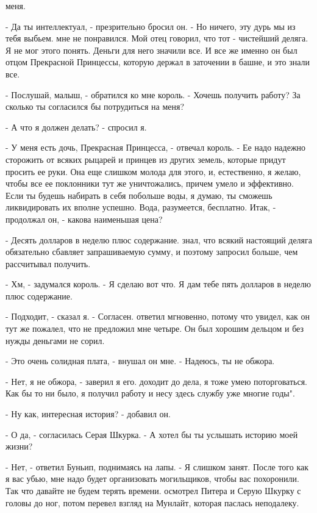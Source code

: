меня.
\par- Да ты интеллектуал, - презрительно бросил он. - Но ничего, эту 
дурь мы из тебя выбьем.
 мне не понравился. Мой отец говорил, что тот - чистейший 
деляга. Я не мог этого понять. Деньги для него значили все. И все же 
именно он был отцом Прекрасной Принцессы, которую держал в заточении в 
башне, и это знали все.
\par- Послушай, малыш, - обратился ко мне король. - Хочешь получить 
работу? За сколько ты согласился бы потрудиться на меня?
\par- А что я должен делать? - спросил я.
\par- У меня есть дочь, Прекрасная Принцесса, - отвечал король. - Ее 
надо надежно сторожить от всяких рыцарей и принцев из других земель, 
которые придут просить ее руки. Она еще слишком молода для этого, и, 
естественно, я желаю, чтобы все ее поклонники тут же уничтожались, 
причем умело и эффективно. Если ты будешь набирать в себя побольше 
воды, я думаю, ты сможешь ликвидировать их вполне успешно. Вода, 
разумеется, бесплатно. Итак, - продолжал он, - какова наименьшая цена?
\par- Десять долларов в неделю плюс содержание.
 знал, что всякий настоящий деляга обязательно сбавляет 
запрашиваемую сумму, и поэтому запросил больше, чем рассчитывал 
получить.
\par- Хм, - задумался король. - Я сделаю вот что. Я дам тебе пять 
долларов в неделю плюс содержание.
\par- Подходит, - сказал я. - Согласен.
 ответил мгновенно, потому что увидел, как он тут же пожалел, что 
не предложил мне четыре. Он был хорошим дельцом и без нужды деньгами 
не сорил.
\par- Это очень солидная плата, - внушал он мне. - Надеюсь, ты не 
обжора.
\par- Нет, я не обжора, - заверил я его.
 доходит до дела, я тоже умею поторговаться. Как бы то ни 
было, я получил работу и несу здесь службу уже многие годы".
\par- Ну как, интересная история? - добавил он.
\par- О да, - согласилась Серая Шкурка. - А хотел бы ты услышать 
историю моей жизни?
\par- Нет, - ответил Буньип, поднимаясь на лапы. - Я слишком занят. 
После того как я вас убью, мне надо будет организовать могильщиков, 
чтобы вас похоронили. Так что давайте не будем терять времени.
 осмотрел Питера и Серую Шкурку с головы до ног, потом перевел 
взгляд на Мунлайт, которая паслась неподалеку.
